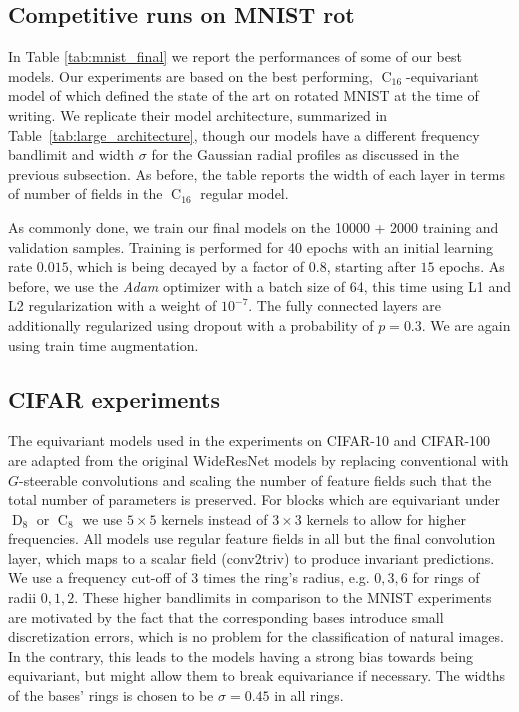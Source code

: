 \documentclass{article}
\newcommand{\D}[1]{\ensuremath{\operatorname{D}_{#1}}}
\newcommand{\C}[1]{\ensuremath{\operatorname{C}_{#1}}}
\begin{document}
\subsection{Competitive runs on MNIST rot}
\label{apx:mnist_final}

In Table \ref{tab:mnist_final} we report the performances of some of our best models.
Our experiments are based on the best performing, $\C{16}$-equivariant model of \cite{Weiler2018-STEERABLE} which defined the state of the art on rotated MNIST at the time of writing.
We replicate their model architecture, summarized in Table~\ref{tab:large_architecture}, though our models have a different frequency bandlimit and width $\sigma$ for the Gaussian radial profiles as discussed in the previous subsection.
As before, the table reports the width of each layer in terms of number of fields in the $\C{16}$ regular model.

As commonly done, we train our final models on the 10000 + 2000 training and validation samples.
Training is performed for 40 epochs with an initial learning rate $0.015$, which is being decayed by a factor of $0.8$, starting after $15$ epochs.
As before, we use the \textit{Adam} optimizer with a batch size of 64, this time using L1 and L2 regularization with a weight of $10^{-7}$.
The fully connected layers are additionally regularized using dropout with a probability of $p=0.3$.
We are again using train time augmentation.





\subsection{CIFAR experiments}
\label{apx:cifar}

The equivariant models used in the experiments on CIFAR-10 and CIFAR-100 are adapted from the original WideResNet models by replacing conventional with $G$-steerable convolutions and scaling the number of feature fields such that the total number of parameters is preserved.
For blocks which are equivariant under $\D8$ or $\C8$ we use $5\times5$ kernels instead of $3\times3$ kernels to allow for higher frequencies. 
All models use regular feature fields in all but the final convolution layer, which maps to a scalar field (conv2triv) to produce invariant predictions.
We use a frequency cut-off of $3$ times the ring's radius, e.g. $0, 3, 6$ for rings of radii $0, 1, 2$.
These higher bandlimits in comparison to the MNIST experiments are motivated by the fact that the corresponding bases introduce small discretization errors, which is no problem for the classification of natural images.
In the contrary, this leads to the models having a strong bias towards being equivariant, but might allow them to break equivariance if necessary.
The widths of the bases' rings is chosen to be $\sigma = 0.45$ in all rings.
\end{document}
